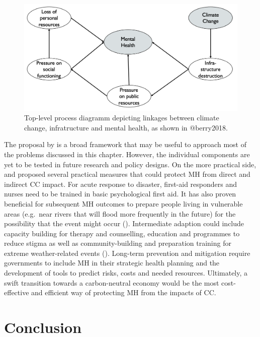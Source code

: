 \documentclass[
]{krantz}
\begin{document}
\begin{figure}

{\centering \includegraphics[width=0.75\linewidth]{work/12-mentalhealth/figures/DAG_infra_2} 

}

\caption{Top-level process diagramm depicting linkages between climate change, infratructure and mental health, as shown in @berry2018.}\label{fig:DAGInfra}
\end{figure}

The proposal by \citet{berry2018} is a broad framework that may be useful to approach most of the problems discussed in this chapter. However, the individual components are yet to be tested in future research and policy designs.
On the more practical side, \citet{hayes2018} and \citet{newnham2020} proposed several practical measures that could protect MH from direct and indirect CC impact. For acute response to disaster, first-aid responders and nurses need to be trained in basic psychological first aid. It has also proven beneficial for subsequent MH outcomes to prepare people living in vulnerable areas (e.g.~near rivers that will flood more frequently in the future) for the possibility that the event might occur (\citet{munro2017}). Intermediate adaption could include capacity building for therapy and counselling, education and programmes to reduce stigma as well as community-building and preparation training for extreme weather-related events (\citet{newnham2020}). Long-term prevention and mitigation require governments to include MH in their strategic health planning and the development of tools to predict risks, costs and needed resources. Ultimately, a swift transition towards a carbon-neutral economy would be the most cost-effective and efficient way of protecting MH from the impacts of CC.

\section{Conclusion}\label{conclusion-7}
\end{document}

